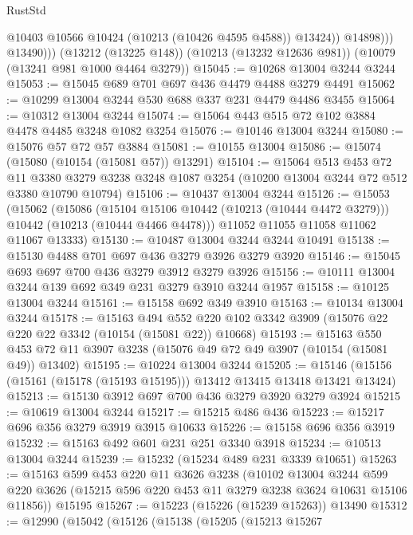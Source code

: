 \begin{lexlean}{RustStd}
\begin{coremodule}
                    @10403
                    @10566
                    @10424
                    (@10213 (@10426 @4595 @4588))
                    @13424))
                @14898)))
          @13490)))
    (@13212 (@13225 @148))
    (@10213 (@13232 @12636 @981))
    (@10079 (@13241 @981 @1000 @4464 @3279))
@15045 := @10268 @13004 @3244 @3244
@15053 := @15045 @689 @701 @697 @436 @4479 @4488 @3279 @4491
@15062 := @10299 @13004 @3244 @530 @688 @337 @231 @4479 @4486 @3455
@15064 := @10312 @13004 @3244
@15074 := @15064 @443 @515 @72 @102 @3884 @4478 @4485 @3248 @1082 @3254
@15076 := @10146 @13004 @3244
@15080 := @15076 @57 @72 @57 @3884
@15081 := @10155 @13004
@15086 := @15074 (@15080 (@10154 (@15081 @57)) @13291)
@15104 := @15064
    @513
    @453
    @72
    @11
    @3380
    @3279
    @3238
    @3248
    @1087
    @3254
    (@10200 @13004 @3244 @72 @512 @3380 @10790 @10794)
@15106 := @10437 @13004 @3244
@15126 := @15053
    (@15062
      (@15086
        (@15104 @15106 @10442 (@10213 (@10444 @4472 @3279)))
        @10442
        (@10213 (@10444 @4466 @4478)))
      @11052
      @11055
      @11058
      @11062
      @11067
      @13333)
@15130 := @10487 @13004 @3244 @3244 @10491
@15138 := @15130 @4488 @701 @697 @436 @3279 @3926 @3279 @3920
@15146 := @15045 @693 @697 @700 @436 @3279 @3912 @3279 @3926
@15156 := @10111 @13004 @3244 @139 @692 @349 @231 @3279 @3910 @3244 @1957
@15158 := @10125 @13004 @3244
@15161 := @15158 @692 @349 @3910
@15163 := @10134 @13004 @3244
@15178 := @15163
    @494
    @552
    @220
    @102
    @3342
    @3909
    (@15076 @22 @220 @22 @3342 (@10154 (@15081 @22)) @10668)
@15193 := @15163
    @550
    @453
    @72
    @11
    @3907
    @3238
    (@15076 @49 @72 @49 @3907 (@10154 (@15081 @49)) @13402)
@15195 := @10224 @13004 @3244
@15205 := @15146 (@15156 (@15161 (@15178 (@15193 @15195))) @13412 @13415 @13418 @13421 @13424)
@15213 := @15130 @3912 @697 @700 @436 @3279 @3920 @3279 @3924
@15215 := @10619 @13004 @3244
@15217 := @15215 @486 @436
@15223 := @15217 @696 @356 @3279 @3919 @3915 @10633
@15226 := @15158 @696 @356 @3919
@15232 := @15163 @492 @601 @231 @251 @3340 @3918
@15234 := @10513 @13004 @3244
@15239 := @15232 (@15234 @489 @231 @3339 @10651)
@15263 := @15163
    @599
    @453
    @220
    @11
    @3626
    @3238
    (@10102
      @13004
      @3244
      @599
      @220
      @3626
      (@15215 @596 @220 @453 @11 @3279 @3238 @3624 @10631 @15106 @11856))
    @15195
@15267 := @15223 (@15226 (@15239 @15263)) @13490
@15312 := @12990
    (@15042
      (@15126
        (@15138
          (@15205
            (@15213
              @15267

\end{coremodule}
\end{lexlean}
